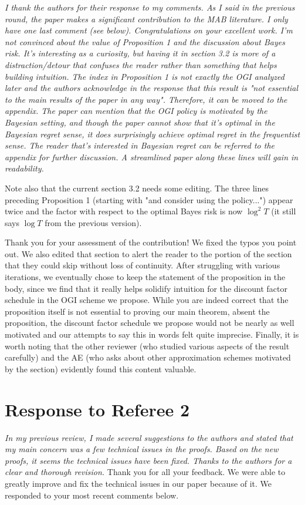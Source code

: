 \documentclass[11pt]{article}
\newcommand{\1}{\ensuremath{\mathbf{1}}} %
\theoremstyle{thm-sf}
\begin{document}
	{\it I thank the authors for their response to my comments. As I said in the previous round, the paper makes a significant contribution to the MAB literature. I only have one last comment (see below). Congratulations on your excellent work.
		I'm not convinced about the value of Proposition 1 and the discussion about Bayes risk. It's interesting as a curiosity, but having it in section 3.2 is more of a distraction/detour that confuses the reader rather than something that helps building intuition. The index in Proposition 1 is not exactly the OGI analyzed later and the authors acknowledge in the response that this result is "not essential to the main results of the paper in any way". Therefore, it can be moved to the appendix. The paper can mention that the OGI policy is motivated by the Bayesian setting, and though the paper cannot show that it's optimal in the Bayesian regret sense, it does surprisingly achieve optimal regret in the frequentist sense. The reader that's interested in Bayesian regret can be referred to the appendix for further discussion. A streamlined paper along these lines will gain in readability.
		
Note also that the current section 3.2 needs some editing. The three lines preceding Proposition 1 (starting with "and consider using the policy...") appear twice and the factor with respect to the optimal Bayes risk is now $\log^2 T$ (it still says $\log T$ from the previous version).	
}
\newline
\newline
\noindent
Thank you for your assessment of the contribution! We fixed the typos you point out. We also edited that section to alert the reader to the portion of the section that they could skip without loss of continuity. After struggling with various iterations, we eventually chose to keep the statement of the proposition in the body, since we find that it really helps solidify intuition for the discount factor schedule in the OGI scheme we propose. While you are indeed correct that the proposition itself is not essential to proving our main theorem, absent the proposition, the discount factor schedule we propose would not be nearly as well motivated and our attempts to say this in words felt quite imprecise. Finally, it is worth noting that the other reviewer (who studied various aspects of the result carefully) and the AE (who asks about other approximation schemes motivated by the section) evidently found this content valuable. 
	
	\newpage
	\section{Response to Referee 2}
	{
	\it 
	In my previous review, I made several suggestions to the authors and stated that my main concern was a few technical issues in the proofs. Based on the new proofs, it seems the technical issues have been fixed. Thanks to the authors for a clear and thorough revision.
	}
    \newline
    \newline
    Thank you for all your feedback. We were able to greatly improve and fix the technical issues in our paper because of it. We responded to your most recent comments below.
\end{document}
